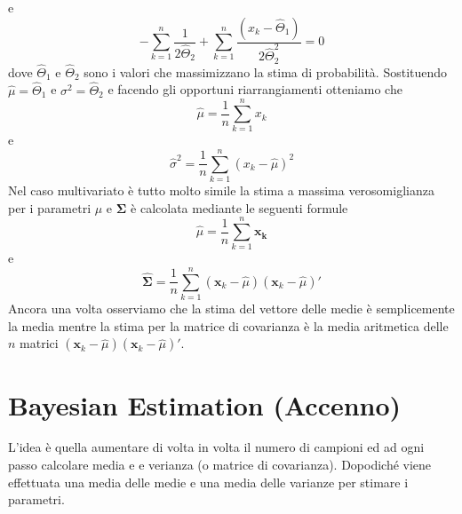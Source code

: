 e
\begin{equation}
- \sum_{k=1}^n \frac{1}{2 \hat{\Theta}_2} + \sum_{k=1}^n \frac{(x_k - \hat{\Theta}_1)}{2 \hat{\Theta}_2^2} = 0
\end{equation}
dove $\hat{\Theta}_1$ e $\hat{\Theta}_2$ sono i valori che massimizzano la stima di probabilità. Sostituendo $\hat{\mu} = \hat{\Theta}_1$ e $\sigma^2 = \hat{\Theta}_2$ e facendo gli opportuni riarrangiamenti otteniamo che 
\begin{equation}
\hat{\mu} = \frac{1}{n} \sum_{k=1}^n x_k
\end{equation}
e
\begin{equation}
\hat{\sigma}^2 = \frac{1}{n} \sum_{k=1}^n (x_k- \hat{\mu})^2
\end{equation}
Nel caso multivariato è tutto molto simile la stima a massima verosomiglianza per i parametri $\mu$ e $\mathbf{\Sigma}$ è calcolata mediante le seguenti formule
\begin{equation}
\hat{\mu} = \frac{1}{n} \sum_{k=1}^n \mathbf{x_k}
\end{equation}
e
\begin{equation}
\hat{\mathbf{\Sigma}} = \frac{1}{n} \sum_{k=1}^n (\mathbf{x}_k - \hat{\mu})(\mathbf{x}_k - \hat{\mu})'
\end{equation}
Ancora una volta osserviamo che la stima del vettore delle medie è semplicemente la media mentre la stima per la matrice di covarianza è la media aritmetica delle $n$ matrici $(\mathbf{x}_k - \hat{\mu})(\mathbf{x}_k - \hat{\mu})'$. 

\section{Bayesian Estimation (Accenno)} 
L'idea è quella aumentare di volta in volta il numero di campioni ed ad ogni passo calcolare media e e verianza (o matrice di covarianza). Dopodiché viene effettuata una media delle medie e una media delle varianze per stimare i parametri.


